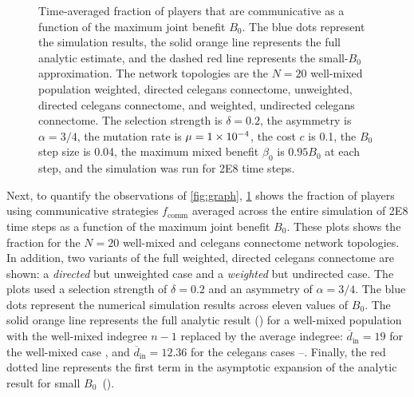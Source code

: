 \documentclass[pdflatex,lineno,referee,sn-mathphys-ay]{sn-jnl}
\begin{document}
\begin{figure}
  \centering
  
  \caption{
    Time-averaged fraction of players that are communicative as a function
    of the maximum joint benefit $B_0$.
    The blue dots represent the simulation results,
    the solid orange line represents the full analytic estimate,
    and the dashed red line represents the small-$B_0$ approximation.
    The network topologies are the
    $N=20$ well-mixed population
    weighted, directed \gls{celegans} connectome,
    unweighted, directed \gls{celegans} connectome,
    and
    weighted, undirected \gls{celegans} connectome.
    The selection strength is $\delta=0.2$,
    the asymmetry is $\alpha=3/4$,
    the mutation rate is $\mu=\num{1E-4}$,
    the cost $c$ is \num{0.1},
    the $B_0$ step size is \num{0.04},
    the maximum mixed benefit $\beta_0$ is $\num{0.95} B_0$ at each step,
    and the simulation was run for \num{2E8} time steps.
  }
  \label{fig:comm-frac}
\end{figure}

Next, to quantify the observations of \cref{fig:graph},
\cref{fig:comm-frac} shows the fraction of players
using communicative strategies $f_{\text{comm}}$ averaged across
the entire simulation of \num{2E8} time steps as a function
of the maximum joint benefit $B_0$.
These plots shows the fraction for the
$N=20$ well-mixed and
\gls{celegans} connectome network topologies.
In addition, two variants of the full weighted, directed \gls{celegans}
connectome are shown:
a  \emph{directed} but unweighted case
and
a  \emph{weighted} but undirected case.
The plots used a selection strength of $\delta=0.2$
and an asymmetry of $\alpha=3/4$.
The blue dots represent the numerical simulation results across eleven
values of $B_0$.
The solid orange line represents the full analytic
result () for a well-mixed population
with the well-mixed indegree $n-1$ replaced by the average
indegree: $\overline{d}_{\text{in}} = \num{19}$
for the well-mixed case ,
and $\overline{d}_{\text{in}} = \num{12.36}$ for the \gls{celegans} cases
--.
Finally, the red dotted line represents the first term
in the asymptotic expansion
of the analytic result for small $B_0$~().
\end{document}
